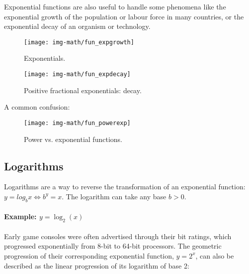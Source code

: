 Exponential functions are also useful to handle some phenomena like the exponential growth of the population or labour force in many countries, or the exponential decay of an organism or technology.

\begin{knitrout}
\color{fgcolor}\begin{figure}[]

\texttt{[image: img-math/fun\_expgrowth]} \caption{Exponentials.\label{fig:fun_expgrowth}}
\end{figure}


\end{knitrout}


\begin{knitrout}
\color{fgcolor}\begin{figure}[]

\texttt{[image: img-math/fun\_expdecay]} \caption{Positive fractional exponentials: decay.\label{fig:fun_expdecay}}
\end{figure}


\end{knitrout}


A common confusion:

\begin{knitrout}
\color{fgcolor}\begin{figure}[]

\texttt{[image: img-math/fun\_powerexp]} \caption{Power vs. exponential functions.\label{fig:fun_powerexp}}
\end{figure}


\end{knitrout}


\subsection{Logarithms}

Logarithms are a way to reverse the transformation of an exponential function: $y = log_b x \iff b^y = x$. The logarithm can take any base $b > 0$.

\paragraph{Example: $y = \log_2(x)$} %
%
Early game consoles were often advertised through their bit ratings, which progressed exponentially from 8-bit to 64-bit processors. The geometric progression of their corresponding exponential function, $y = 2^x$, can also be described as the linear progression of its logarithm of base 2:

